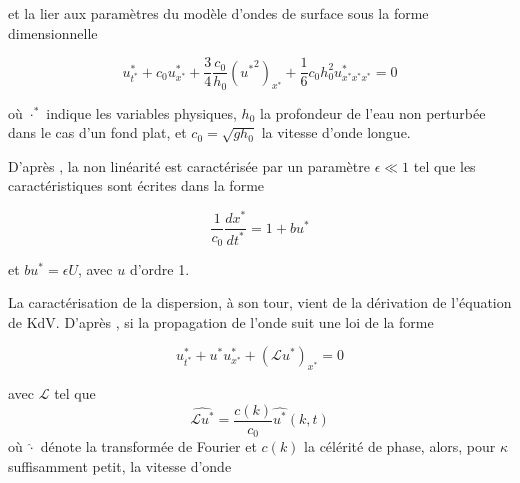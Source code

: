 \noindent et la lier aux paramètres du modèle d'ondes de surface sous la forme dimensionnelle \cite{Khorsand2014}

\begin{equation}
\label{eq:physiqueKdV}
    u^*_{t^*} + c_0u^*_{x^*} + \frac{3}{4}\frac{c_0}{h_0}({u^*}^2)_{x^*} + \frac{1}{6}c_0h_0^2u^*_{x^*x^*x^*} = 0 
\end{equation}

\noindent où $\cdot^*$ indique les variables physiques, $h_0$ la profondeur de l'eau non perturbée dans le cas d'un fond plat, et $c_0 = \sqrt{gh_0}$ la vitesse d'onde longue.

%
%
%
%
%
%
%
%


\indent D'après \cite{BBM1971}, la non linéarité est caractérisée par un paramètre $\epsilon \ll 1$ tel que les caractéristiques sont écrites dans la forme

$$ \frac{1}{c_0} \frac{dx^*}{dt^*} = 1+ bu^*$$

\noindent et $bu^*=\epsilon U$, avec $u$ d'ordre 1. 


\indent La caractérisation de la dispersion, à son tour, vient de la dérivation de l'équation de KdV. D'après \cite{BBM1971}, si la propagation de l'onde suit une loi de la forme

$$ u^*_{t^*} + u^*u^*_{x^*}+(\mathcal{L} u^*)_{x^*} = 0$$

\noindent avec $\mathcal{L}$ tel que $$ \widehat{\mathcal{L}u^*} = \frac{c(k)}{c_0} \widehat{u^*}(k,t)$$ où $\hat \cdot$ dénote la transformée de Fourier et  $c(k)$ la célérité  de phase, alors, pour $\kappa$ suffisamment petit, la vitesse d'onde

